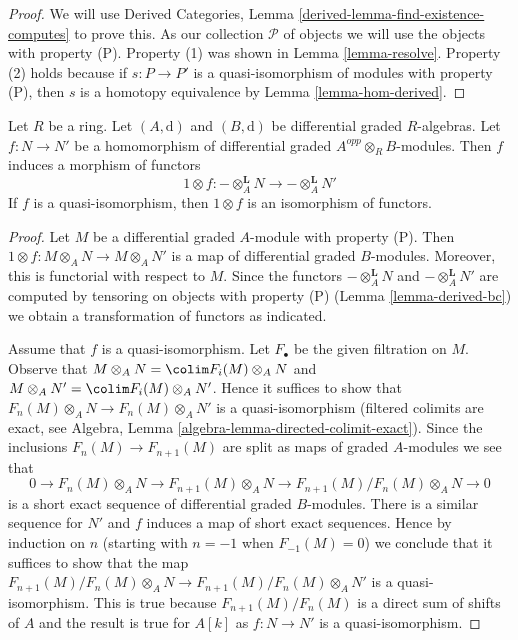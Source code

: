 \begin{proof}
We will use
Derived Categories, Lemma \ref{derived-lemma-find-existence-computes}
to prove this. As our collection $\mathcal{P}$
of objects we will use the objects with property (P).
Property (1) was shown in Lemma \ref{lemma-resolve}.
Property (2) holds because if $s : P \to P'$ is a quasi-isomorphism
of modules with property (P), then $s$ is a homotopy equivalence
by Lemma \ref{lemma-hom-derived}.
\end{proof}

\begin{lemma}
\label{lemma-functoriality-bc}
Let $R$ be a ring. Let $(A, \text{d})$ and $(B, \text{d})$ be
differential graded $R$-algebras. Let $f : N \to N'$ be a
homomorphism of differential graded $A^{opp} \otimes_R B$-modules.
Then $f$ induces a morphism of functors
$$
1\otimes f :
- \otimes_A^\mathbf{L} N
\longrightarrow
- \otimes_A^\mathbf{L} N'
$$
If $f$ is a quasi-isomorphism, then $1 \otimes f$ is an isomorphism of
functors.
\end{lemma}

\begin{proof}
Let $M$ be a differential graded $A$-module with property (P).
Then $1 \otimes f : M \otimes_A N \to M \otimes_A N'$ is a
map of differential graded $B$-modules. Moreover, this is functorial
with respect to $M$. Since the functors
$- \otimes_A^\mathbf{L} N$ and $- \otimes_A^\mathbf{L} N'$ are
computed by tensoring on objects with property (P)
(Lemma \ref{lemma-derived-bc}) we obtain a transformation of functors
as indicated.

\medskip\noindent
Assume that $f$ is a quasi-isomorphism. Let $F_\bullet$ be the
given filtration on $M$. Observe that
$M \otimes_A N = \colim F_i(M) \otimes_A N$ and
$M \otimes_A N' = \colim F_i(M) \otimes_A N'$.
Hence it suffices to show that
$F_n(M) \otimes_A N \to F_n(M) \otimes_A N'$
is a quasi-isomorphism (filtered colimits are exact, see
Algebra, Lemma \ref{algebra-lemma-directed-colimit-exact}).
Since the inclusions $F_n(M) \to F_{n + 1}(M)$
are split as maps of graded $A$-modules we see that
$$
0 \to F_n(M) \otimes_A N \to F_{n + 1}(M) \otimes_A N \to
F_{n + 1}(M)/F_n(M) \otimes_A N \to 0
$$
is a short exact sequence of differential graded $B$-modules.
There is a similar sequence for $N'$ and $f$ induces a map
of short exact sequences. Hence by induction on $n$ (starting with $n = -1$
when $F_{-1}(M) = 0$) we conclude that it suffices to show that
the map $F_{n + 1}(M)/F_n(M) \otimes_A N \to F_{n + 1}(M)/F_n(M) \otimes_A N'$
is a quasi-isomorphism. This is true because $F_{n + 1}(M)/F_n(M)$
is a direct sum of shifts of $A$ and the result is true for $A[k]$
as $f : N \to N'$ is a quasi-isomorphism.
\end{proof}

